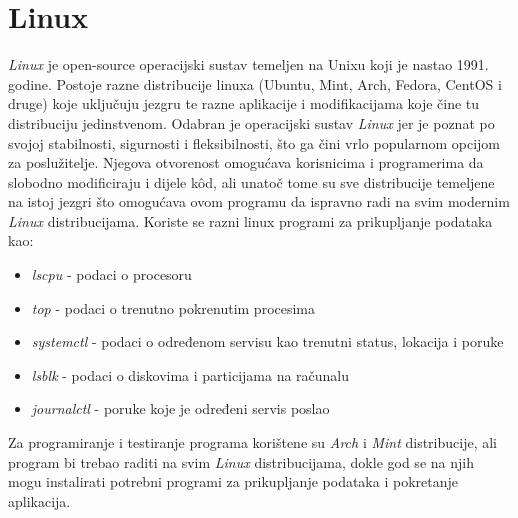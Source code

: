 \documentclass[zavrsnirad]{fer}
\begin{document}
\section{Linux}
\textit{Linux} je open-source operacijski sustav temeljen na Unixu koji je nastao 1991. godine. Postoje razne distribucije linuxa (Ubuntu, Mint, Arch, Fedora, CentOS i druge) koje uključuju jezgru te razne aplikacije i modifikacijama koje čine tu distribuciju jedinstvenom. Odabran je operacijski sustav \textit{Linux} jer je poznat po svojoj stabilnosti, sigurnosti i fleksibilnosti, što ga čini vrlo popularnom opcijom za poslužitelje. Njegova otvorenost omogućava korisnicima i programerima da slobodno modificiraju i dijele kôd, ali unatoč tome su sve distribucije temeljene na istoj jezgri što omogućava ovom programu da ispravno radi na svim modernim \textit{Linux} distribucijama.
Koriste se razni linux programi za prikupljanje podataka kao:
\begin{itemize}
	\item  \textit{lscpu} - podaci o procesoru
	\item \textit{top} - podaci o trenutno pokrenutim procesima
	\item \textit{systemctl} - podaci o određenom servisu kao trenutni status, lokacija i poruke
	\item \textit{lsblk} -  podaci o diskovima i particijama na računalu
	\item \textit{journalctl} - poruke koje je određeni servis poslao
\end{itemize}
Za programiranje i testiranje programa korištene su \textit{Arch} i \textit{Mint} distribucije, ali program bi trebao raditi na svim \textit{Linux} distribucijama, dokle god se na njih mogu instalirati potrebni programi za prikupljanje podataka i pokretanje aplikacija.
\end{document}
